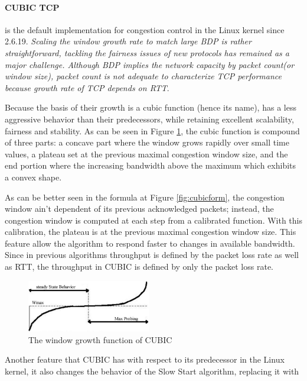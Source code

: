 \paragraph{CUBIC TCP}  is the default implementation for congestion control in
the Linux kernel since 2.6.19. \textit{Scaling the window growth rate to match
large \gls{BDP} is rather straightforward, tackling the fairness issues of new
protocols has remained as a major challenge.  Although BDP implies the network
capacity by packet count(or window size), packet count is not adequate to
characterize TCP performance because growth rate of TCP depends on
RTT}\cite{HaCubic}.

Because the basis of their growth is a cubic function (hence its name), has a
less aggressive behavior than their predecessors, while retaining excellent
scalability, fairness and stability. As can be seen in Figure
\ref{fig:cubicfunc}, the cubic function is compound of three parts: a concave
part where the window grows rapidly over small time values, a plateau set at the previous maximal
congestion window size, and the end portion where the increasing bandwidth
above the maximum which exhibits a convex shape.

As can be better seen in the formula at Figure \ref{fig:cubicform}, the congestion
window ain't dependent of its previous acknowledged packets; instead, the
congestion window is computed at each step from a calibrated function. With
this calibration, the plateau is at the previous maximal congestion window
size. This feature allow the algorithm to respond faster to changes in
available bandwidth. Since in previous algorithms throughput is defined by the
packet loss rate as well as RTT, the throughput in CUBIC is defined by only
the packet loss rate.

\begin{figure}
\begin{center}
    \includegraphics[width=0.48\textwidth]{img/cubic}
  \end{center}
\caption{The window growth function of CUBIC}
\label{fig:cubicfunc}
\end{figure}

Another feature that CUBIC has with respect to its predecessor in the Linux
kernel, it also changes the behavior of the Slow Start algorithm, replacing it
with

